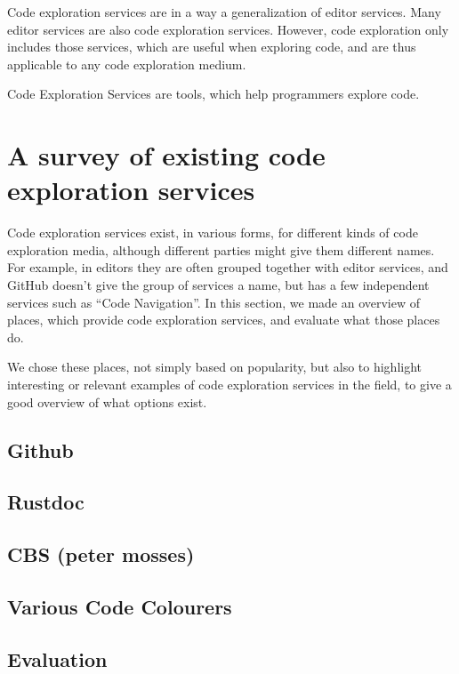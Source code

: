 Code exploration services are in a way a generalization of editor services.
Many editor services are also code exploration services.
However, code exploration only includes those services, which are useful when exploring code, and are thus applicable to any
code exploration medium.

\begin{definition}
    Code Exploration Services are tools, which help programmers explore code.
\end{definition}

\section{A survey of existing code exploration services}\label{sec:a-survey-of-existing-code-exploration-services}

Code exploration services exist, in various forms, for different kinds of code exploration media, although different parties might give them different names.
For example, in editors they are often grouped together with editor services, and GitHub doesn't give the group of
services a name, but has a few independent services such as ``Code Navigation''.
In this section, we made an overview of places, which provide code exploration services, and evaluate what those places do.

We chose these places, not simply based on popularity, but also to highlight interesting or relevant examples of code exploration services in
the field, to give a good overview of what options exist.

\subsection{Github}
\subsection{Rustdoc}
\subsection{CBS (peter mosses)}
\subsection{Various Code Colourers}

\subsection{Evaluation}

